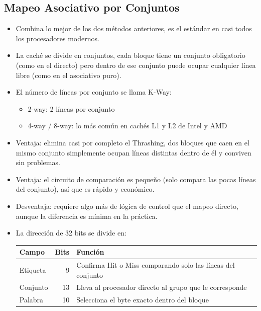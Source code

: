 \documentclass{article}
\begin{document}
\subsection{Mapeo Asociativo por Conjuntos}
\label{sec:org243d03f}
\begin{itemize}
\item Combina lo mejor de los dos métodos anteriores, es el estándar en
casi todos los procesadores modernos.
\item La caché se divide en \alert{conjuntos}, cada bloque tiene un conjunto
obligatorio (como en el directo) pero dentro de ese conjunto puede
ocupar cualquier línea libre (como en el asociativo puro).
\item El número de líneas por conjunto se llama \alert{K-Way}:
\begin{itemize}
\item 2-way: 2 líneas por conjunto
\item 4-way / 8-way: lo más común en cachés L1 y L2 de Intel y AMD
\end{itemize}
\item \alert{Ventaja}: elimina casi por completo el Thrashing, dos bloques que
caen en el mismo conjunto simplemente ocupan líneas distintas dentro
de él y conviven sin problemas.
\item \alert{Ventaja}: el circuito de comparación es pequeño (solo compara las
pocas líneas del conjunto), así que es rápido y económico.
\item \alert{Desventaja}: requiere algo más de lógica de control que el mapeo
directo, aunque la diferencia es mínima en la práctica.
\item La dirección de 32 bits se divide en:
\begin{center}
\begin{tabular}{lrl}
Campo & Bits & Función\\[0pt]
\hline
Etiqueta & 9 & Confirma Hit o Miss comparando solo las líneas del conjunto\\[0pt]
Conjunto & 13 & Lleva al procesador directo al grupo que le corresponde\\[0pt]
Palabra & 10 & Selecciona el byte exacto dentro del bloque\\[0pt]
\end{tabular}
\end{center}
\end{itemize}
\end{document}
